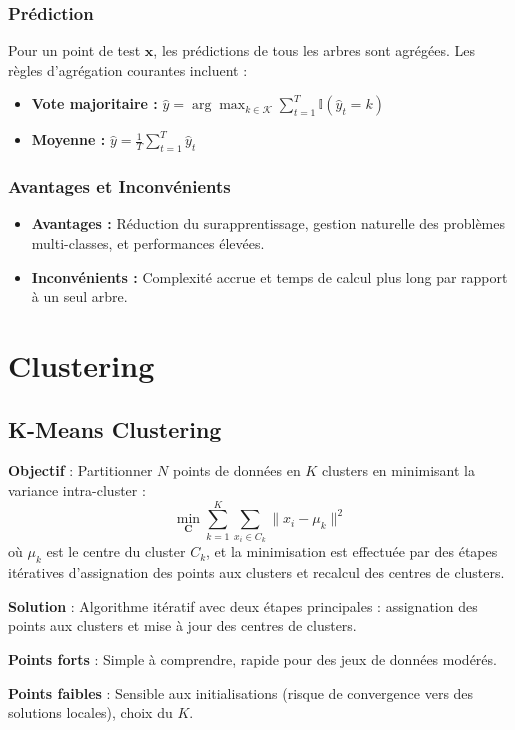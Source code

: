 \documentclass[a4paper,portrait]{article}
\begin{document}
\begin{multicols}{2}
\subsubsection{Prédiction}
Pour un point de test \( \mathbf{x} \), les prédictions de tous les arbres sont agrégées. Les règles d'agrégation courantes incluent :
\begin{itemize}
    \item \textbf{Vote majoritaire :} \( \hat{y} = \arg \max_{k \in \mathcal{K}} \sum_{t=1}^T \mathbb{I}(\hat{y}_t = k) \)
    \item \textbf{Moyenne :} \( \hat{y} = \frac{1}{T} \sum_{t=1}^T \hat{y}_t \)
\end{itemize}

\subsubsection{Avantages et Inconvénients}
\begin{itemize}
    \item \textbf{Avantages :} Réduction du surapprentissage, gestion naturelle des problèmes multi-classes, et performances élevées.
    \item \textbf{Inconvénients :} Complexité accrue et temps de calcul plus long par rapport à un seul arbre.
\end{itemize}

\newpage
\section{Clustering}
\subsection{K-Means Clustering}

\textbf{Objectif} : Partitionner \( N \) points de données en \( K \) clusters en minimisant la variance intra-cluster :
\[
\min_{\mathbf{C}} \sum_{k=1}^{K} \sum_{x_i \in C_k} \| x_i - \mu_k \|^2
\]
où \( \mu_k \) est le centre du cluster \( C_k \), et la minimisation est effectuée par des étapes itératives d'assignation des points aux clusters et recalcul des centres de clusters.

\textbf{Solution} : Algorithme itératif avec deux étapes principales : assignation des points aux clusters et mise à jour des centres de clusters.

\textbf{Points forts} : Simple à comprendre, rapide pour des jeux de données modérés.

\textbf{Points faibles} : Sensible aux initialisations (risque de convergence vers des solutions locales), choix du \(K\).


\end{multicols}
\end{document}
